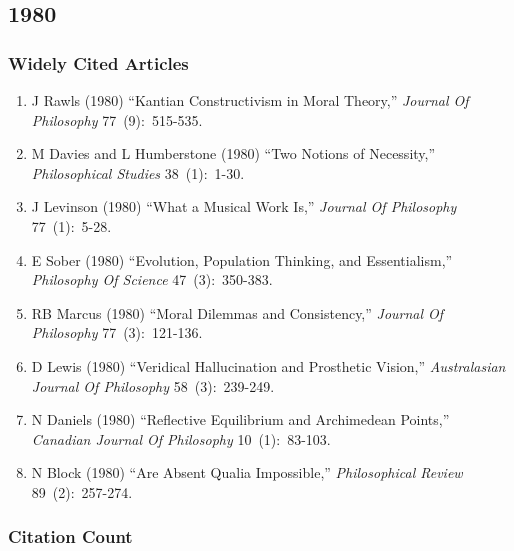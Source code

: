 \documentclass[
  10pt,
  letterpaper,
  DIV=11,
  numbers=noendperiod,
  twoside]{scrartcl}
\providecommand{\tightlist}{%
  \setlength{\itemsep}{0pt}\setlength{\parskip}{0pt}}\usepackage{longtable,booktabs,array}
\begin{document}
\newpage

\subsection{1980}\label{sec-s1980}

\subsubsection*{Widely Cited Articles}\label{widely-cited-articles-23}

\begin{enumerate}
\def\labelenumi{\arabic{enumi}.}
\tightlist
\item
  J Rawls (1980) ``Kantian Constructivism in Moral Theory,''
  \emph{Journal Of Philosophy} 77~(9):~515-535.
\item
  M Davies and L Humberstone (1980) ``Two Notions of Necessity,''
  \emph{Philosophical Studies} 38~(1):~1-30.
\item
  J Levinson (1980) ``What a Musical Work Is,'' \emph{Journal Of
  Philosophy} 77~(1):~5-28.
\item
  E Sober (1980) ``Evolution, Population Thinking, and Essentialism,''
  \emph{Philosophy Of Science} 47~(3):~350-383.
\item
  RB Marcus (1980) ``Moral Dilemmas and Consistency,'' \emph{Journal Of
  Philosophy} 77~(3):~121-136.
\item
  D Lewis (1980) ``Veridical Hallucination and Prosthetic Vision,''
  \emph{Australasian Journal Of Philosophy} 58~(3):~239-249.
\item
  N Daniels (1980) ``Reflective Equilibrium and Archimedean Points,''
  \emph{Canadian Journal Of Philosophy} 10~(1):~83-103.
\item
  N Block (1980) ``Are Absent Qualia Impossible,'' \emph{Philosophical
  Review} 89~(2):~257-274.
\end{enumerate}

\subsubsection*{Citation Count}\label{sec-count-1980}
\end{document}
